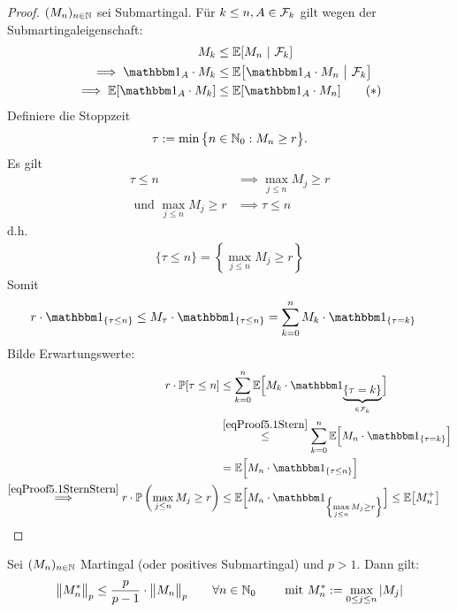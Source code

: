 \begin{proof}
$(M_n)_{n\in\mathbb{N}}$ sei Submartingal. Für $k\leq n,A\in\mathcal{F}_k$ gilt wegen der Submartingaleigenschaft:
\begin{align}
M_k&\leq\E[M_n~|~\F_k]\nonumber\\
\implies\indi_A\cdot M_k &\leq\E\big[\indi_A\cdot M_n~\big|~\F_k\big]\nonumber\\
\implies\E[\indi_A\cdot M_k]&\leq\E[\indi_A\cdot M_n]\label{eqProof5.1Stern}\tag{$\ast$}
\end{align}
Definiere die Stoppzeit
\begin{align*}
\tau:=\min\big\lbrace n\in\mathbb{N}_0:M_n\geq r\big\rbrace.
\end{align*}
Es gilt
\begin{align*}
\tau\leq n&\implies \max\limits_{j\leq n} M_j\geq r\\
\text{ und } \max\limits_{j\leq n} M_j\geq r&\implies\tau\leq n
\end{align*}
d.h.
\begin{align}\label{eqProof5.1SternStern}\tag{$\ast\ast$}
\lbrace\tau\leq n\rbrace=\left\lbrace\max\limits_{j\leq n} M_j\geq r\right\rbrace
\end{align}
Somit
\begin{align*}
r\cdot\indi_{\lbrace\tau\leq n\rbrace}
&\leq M_\tau\cdot\indi_{\lbrace\tau\leq n\rbrace}
=\sum\limits_{k=0}^n M_k\cdot\indi_{\lbrace\tau=k\rbrace}
\end{align*}
Bilde Erwartungswerte:
\begin{align*}
r\cdot\P[\tau\leq n]
&\leq\sum\limits_{k=0}^n\E\Big[M_k\cdot\indi_{\underbrace{\lbrace\tau=k\rbrace}_{\in\F_k}}\Big]\\
&\stackrel{\eqref{eqProof5.1Stern}}{\leq}
\sum\limits_{k=0}^n\E\Big[M_n\cdot\indi_{\lbrace\tau=k\rbrace}\Big]\\
&=\E\Big[M_n\cdot\indi_{\lbrace\tau\leq n\rbrace}\Big]\\
\stackrel{\eqref{eqProof5.1SternStern}}{\implies}
r\cdot\P\left(\max\limits_{j\leq n} M_j\geq r\right)
&\leq\E\Big[M_n\cdot\indi_{\left\lbrace\max\limits_{j\leq n} M_j\geq r\right\rbrace}\Big]
\leq\E\big[M_n^+\big]
\end{align*}
\end{proof}

\begin{theorem}\label{theorem5.2DoobsLpUngleichung}\enter
Sei $(M_n)_{n\in\mathbb{N}}$ Martingal (oder positives Submartingal) und $p>1$. Dann gilt:
\begin{align*}
\big\Vert M_n^\ast\big\Vert_{p}\leq\frac{p}{p-1}\cdot\big\Vert M_n\big\Vert_p\qquad\forall n\in\mathbb{N}_0\qquad\text{ mit } M_n^\ast:=\max\limits_{0\leq j\leq n}|M_j|
\end{align*}
\end{theorem}

